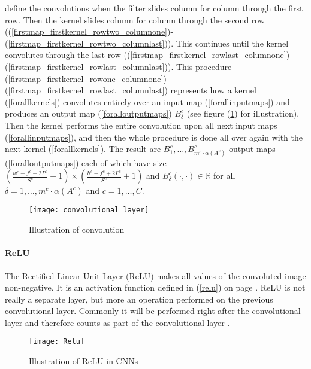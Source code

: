 \documentclass{article}
\begin{document}
define the convolutions when the filter slides column for column through the first row. Then the kernel slides column for column through the second row ((\ref{firstmap_firstkernel_rowtwo_columnone})-(\ref{firstmap_firstkernel_rowtwo_columnlast})).
This continues until the kernel convolutes through the last row ((\ref{firstmap_firstkernel_rowlast_columnone})-(\ref{firstmap_firstkernel_rowlast_columnlast})).
This procedure (\ref{firstmap_firstkernel_rowone_columnone})-(\ref{firstmap_firstkernel_rowlast_columnlast})
represents how a kernel (\ref{forallkernels}) convolutes entirely over an input map (\ref{forallinputmaps}) and produces an output map (\ref{foralloutputmaps}) $B_\delta^c$  (see figure (\ref{kernel}) for illustration). Then the kernel performs the entire convolution upon all next input maps (\ref{forallinputmaps}), and then the whole procedure is done all over again with the next kernel (\ref{forallkernels}). The result are $B^c_1, \ldots, B^c_{m^c \cdot \alpha(A^c)}$ output maps (\ref{foralloutputmaps}) each of which have size $\left(\frac{w^c - f^c + 2P^c}{S^c} + 1\right) \times \left(\frac{h^c - f^c + 2P^c}{S^c} + 1\right)$ and $B_\delta^c( \cdot, \cdot) \in \mathbb{R}$ for all $\delta = 1, \ldots, m^c \cdot \alpha(A^c)$ and $c=1, \ldots, C$.

\begin{figure}[!htb]
\vskip 0.2in
\begin{center}
\centerline{\texttt{[image: convolutional\_layer]}}
\caption{Illustration of convolution \cite{conv}}\label{kernel}
\end{center}
\vskip -0.2in
\end{figure}


\paragraph{ReLU} The Rectified Linear Unit Layer (ReLU) makes all values of the convoluted image non-negative. It is an activation function defined in (\ref{relu}) on page \pageref{relu}. ReLU is not really a separate layer, but more an operation performed on the previous convolutional layer. Commonly it will be performed right after the convolutional layer and therefore counts as part of the convolutional layer \cite{Goodfellow-et-al-2016}.

\begin{figure}[!htb]
\vskip 0.2in
\begin{center}
\centerline{\texttt{[image: Relu]}}
\caption{Illustration of ReLU in CNNs \cite{relu}}
\end{center}
\vskip -0.2in
\end{figure}
\end{document}
